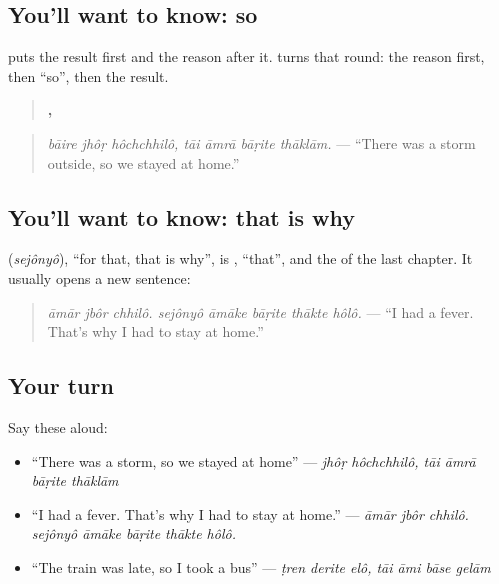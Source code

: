 \subsection*{You'll want to know: so}
\textbf{} puts the result first and the reason after it. \textbf{} turns that round: the reason first, then \textquotedblleft{}so\textquotedblright{}, then the result.

\begin{quote}
\textbf{  ,    }
\end{quote}

\begin{quote}
\emph{bāire jhôṛ hôchchhilô, tāi āmrā bāṛite thāklām.} — \textquotedblleft{}There was a storm outside, so we stayed at home.\textquotedblright{}
\end{quote}

\subsection*{You'll want to know: that is why}
\textbf{} (\emph{sejônyô}), \textquotedblleft{}for that, that is why\textquotedblright{}, is \textbf{}, \textquotedblleft{}that\textquotedblright{}, and the \textbf{} of the last chapter. It usually opens a new sentence:

\begin{quote}
\textbf{       }
\end{quote}

\begin{quote}
\emph{āmār jbôr chhilô. sejônyô āmāke bāṛite thākte hôlô.} — \textquotedblleft{}I had a fever. That's why I had to stay at home.\textquotedblright{}
\end{quote}

\subsection*{Your turn}
Say these aloud:

\begin{itemize}
\raggedright
  \item \textquotedblleft{}There was a storm, so we stayed at home\textquotedblright{} — \emph{jhôṛ hôchchhilô, tāi āmrā bāṛite thāklām}
  \item \textquotedblleft{}I had a fever. That's why I had to stay at home.\textquotedblright{} — \emph{āmār jbôr chhilô. sejônyô āmāke bāṛite thākte hôlô.}
  \item \textquotedblleft{}The train was late, so I took a bus\textquotedblright{} — \emph{ṭren derite elô, tāi āmi bāse gelām}
\end{itemize}

